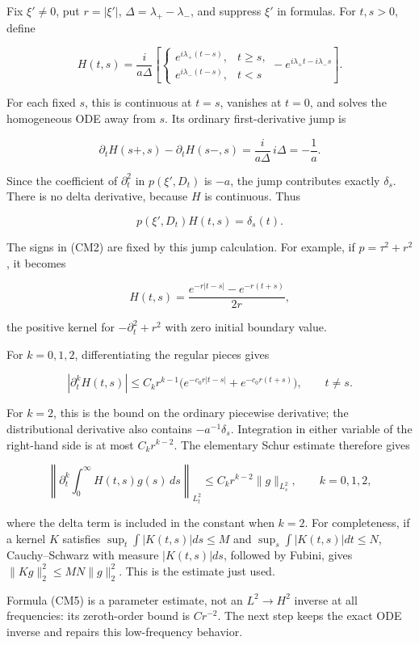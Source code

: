 \documentclass[
  11pt,
]{article}
\begin{document}
Fix \(\xi'\ne0\), put \(r=|\xi'|\), \(\Delta=\lambda_+-\lambda_-\), and
suppress \(\xi'\) in formulas. For \(t,s>0\), define

\[
H(t,s)=\frac{i}{a\Delta}
\left[
\begin{cases}
e^{i\lambda_+(t-s)},&t\geq s,\\
e^{i\lambda_-(t-s)},&t<s
\end{cases}
-e^{i\lambda_+t-i\lambda_-s}
\right].
\tag{CM2}
\]

For each fixed \(s\), this is continuous at \(t=s\), vanishes at
\(t=0\), and solves the homogeneous ODE away from \(s\). Its ordinary
first-derivative jump is

\[
\partial_tH(s+,s)-\partial_tH(s-,s)
=\frac{i}{a\Delta}\,i\Delta=-\frac1a.
\]

Since the coefficient of \(\partial_t^2\) in \(p(\xi',D_t)\) is \(-a\),
the jump contributes exactly \(\delta_s\). There is no delta derivative,
because \(H\) is continuous. Thus

\[
p(\xi',D_t)H(t,s)=\delta_s(t).
\tag{CM3}
\]

The signs in (CM2) are fixed by this jump calculation. For example, if
\(p=\tau^2+r^2\), it becomes

\[
H(t,s)=\frac{e^{-r|t-s|}-e^{-r(t+s)}}{2r},
\]

the positive kernel for \(-\partial_t^2+r^2\) with zero initial boundary
value.

For \(k=0,1,2\), differentiating the regular pieces gives

\[
|\partial_t^kH(t,s)|
\leq C_k r^{k-1}
\bigl(e^{-c_0r|t-s|}+e^{-c_0r(t+s)}\bigr),\qquad t\ne s.
\tag{CM4}
\]

For \(k=2\), this is the bound on the ordinary piecewise derivative; the
distributional derivative also contains \(-a^{-1}\delta_s\). Integration
in either variable of the right-hand side is at most \(C_kr^{k-2}\). The
elementary Schur estimate therefore gives

\[
\left\|\partial_t^k\int_0^\infty H(t,s)g(s)\,ds\right\|_{L^2_t}
\leq C_k r^{k-2}\|g\|_{L^2_s},\qquad k=0,1,2,
\tag{CM5}
\]

where the delta term is included in the constant when \(k=2\). For
completeness, if a kernel \(K\) satisfies \(\sup_t\int|K(t,s)|ds\leq M\)
and \(\sup_s\int|K(t,s)|dt\leq N\), Cauchy--Schwarz with measure
\(|K(t,s)|ds\), followed by Fubini, gives
\(\|Kg\|_2^2\leq MN\|g\|_2^2\). This is the estimate just used.

Formula (CM5) is a parameter estimate, not an \(L^2\to H^2\) inverse at
all frequencies: its zeroth-order bound is \(Cr^{-2}\). The next step
keeps the exact ODE inverse and repairs this low-frequency behavior.
\end{document}
